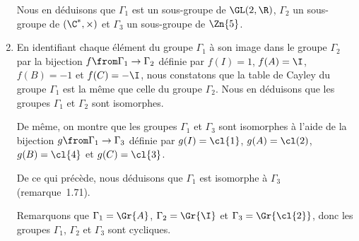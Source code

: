 \begin{enumerate}
  Nous en déduisons que $\Gamma_1$ est un sous-groupe de $\GL(2,\R)$, $\Gamma_2$ un sous-groupe de $(\C^*,\times)$ et $\Gamma_3$ un sous-groupe de $\Zn{5}$.

\item
  En identifiant chaque élément du groupe $\Gamma_1$ à son image dans le groupe $\Gamma_2$ par la bijection $f\from\Gamma_1\to\Gamma_2$ définie par $f(I) = 1$, $f(A) = \I$, $f(B) = -1$ et $f(C) = -\I$, nous constatons que la table de Cayley du groupe $\Gamma_1$ est la même que celle du groupe $\Gamma_2$.
  Nous en déduisons que les groupes $\Gamma_1$ et $\Gamma_2$ sont isomorphes.

  De même, on montre que les groupes $\Gamma_1$ et $\Gamma_3$ sont isomorphes à l'aide de la bijection $g\from\Gamma_1\to\Gamma_3$ définie par $g(I) = \cl{1}$, $g(A) = \cl(2)$, $g(B) = \cl{4}$ et $g(C) = \cl{3}$.

  De ce qui précède, nous déduisons que $\Gamma_1$ est isomorphe à $\Gamma_3$ (remarque~1.71).

  Remarquons que $\Gamma_1 = \Gr{A}$, $\Gamma_2 = \Gr{\I}$ et $\Gamma_3 = \Gr{\cl{2}}$, donc les groupes $\Gamma_1$, $\Gamma_2$ et $\Gamma_3$ sont cycliques.
\end{enumerate}
